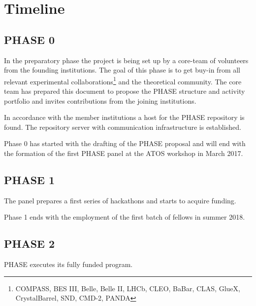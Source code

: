 \section{Timeline}

\subsection{PHASE 0}
In the preparatory phase the project is being set up by a core-team of volunteers from the founding institutions. The goal of this phase is to get buy-in from all relevant
experimental collaborations\footnote{COMPASS, BES III, Belle, Belle II, LHCb, CLEO, BaBar, CLAS, GlueX, CrystalBarrel, SND, CMD-2, PANDA} and the theoretical community.  The core team has prepared this document to propose the PHASE structure and activity portfolio and invites contributions from the joining institutions.

In accordance with the member institutions a host for the PHASE repository is found. The repository server with communication infrastructure is established.


Phase 0 has started with the drafting of the PHASE proposal and will end with the formation of the first PHASE panel at the ATOS workshop in March 2017.

\subsection{PHASE 1}
The panel prepares a first series of hackathons and starts to acquire funding.

Phase 1 ends with the employment of the first batch of fellows in summer 2018.
\subsection{PHASE 2}
PHASE executes its fully funded program.